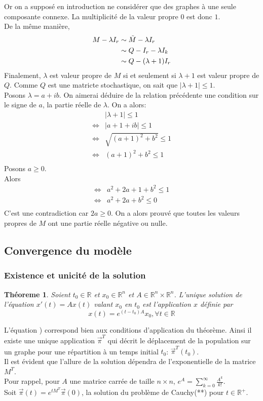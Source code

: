 \documentclass[a4paper]{article}
\theoremstyle{plain}
\newtheorem{thm}{Théoreme}[section]
\theoremstyle{definition}
\theoremstyle{remark}
\begin{document}
Or on a supposé en introduction ne considérer que des graphes à une seule composante connexe. La multiplicité de la valeur propre $0$ est donc $1$.\\
De la même manière, 
\begin{align*}
    M-\lambda I_r&\sim\Tilde{M}-\lambda I_r\\
    &\sim Q-I_r-\lambda I_k\\
    &\sim Q-(\lambda +1)I_r
\end{align*}
Finalement, $\lambda$ est valeur propre de $M$ si et seulement si $\lambda +1$ est valeur propre de $Q$. Comme $Q$ est une matricte stochastique, on sait que $|\lambda +1|\leqslant1$.\\
Posons $\lambda=a+ib$. On aimerai déduire de la relation précédente une condition sur le signe de $a$, la partie réelle de $\lambda$.
On a alors:
\begin{align*}
   &|\lambda +1|\leqslant1\\
  \Leftrightarrow&|a+1+ib|\leqslant1\\
  \Leftrightarrow&\sqrt{(a+1)^2+b^2}\leqslant1\\
  \Leftrightarrow&(a+1)^2+b^2\leqslant1\\
\end{align*}
Posons $a\geq0$.\\
Alors
\begin{align*}
    \Leftrightarrow&a^2+2a+1+b^2\leqslant1\\
    \Leftrightarrow&a^2+2a+b^2\leqslant0\\
\end{align*}
C'est une contradiction car $2a\geq0$. On a alors prouvé que toutes les valeurs propres de $M$ ont une partie réelle négative ou nulle.
\subsection{Convergence du modèle}
\subsubsection{Existence et unicité de la solution}
\begin{thm}
Soient $t_0\in \mathbb{R}$ et $x_0\in \mathbb{R}^n$ et $A\in \mathbb{R}^n\times\mathbb{R}^n$. L'unique solution de l'équation $x'(t)=Ax(t)$ valant $x_0$ en $t_0$ est l'application $x$ définie par
$$x(t)=e^{(t-t_0)A}x_0,      \forall t\in \mathbb{R}$$
\end{thm}
L'équation ) correspond bien aux conditions d'application du théorème. Ainsi il existe une unique application $\vec{\pi}^T$ qui décrit le déplacement de la population sur un graphe pour une répartition à un temps initial $t_0$: $\vec{\pi}^T(t_0)$. \\
Il est évident que l'allure de la solution dépendra de l'exponentielle de la matrice $M^T$. \\
Pour rappel, pour $A$ une matrice carrée de taille $n\times n$, $e^A=\sum_{k=0}^{\infty}\frac{A^k}{k!}$.\\
Soit $\vec{\pi}(t)=e^{tM^T}\vec{\pi}(0)$, la solution du problème de Cauchy(**) pour $t\in\mathbb{R}^+$.\\
\end{document}
